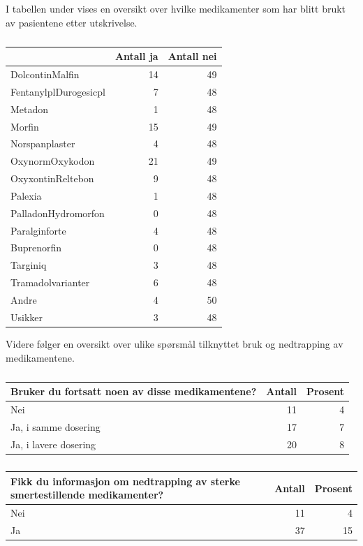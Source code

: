 \documentclass[
]{article}
\begin{document}
I tabellen under vises en oversikt over hvilke medikamenter som har
blitt brukt av pasientene etter utskrivelse.

\begin{table}

\caption{\label{tab:opi}}
\centering
\begin{tabular}[t]{l|r|r}
\hline
  & Antall ja & Antall nei\\
\hline
DolcontinMalfin & 14 & 49\\
\hline
FentanylplDurogesicpl & 7 & 48\\
\hline
Metadon & 1 & 48\\
\hline
Morfin & 15 & 49\\
\hline
Norspanplaster & 4 & 48\\
\hline
OxynormOxykodon & 21 & 49\\
\hline
OxyxontinReltebon & 9 & 48\\
\hline
Palexia & 1 & 48\\
\hline
PalladonHydromorfon & 0 & 48\\
\hline
Paralginforte & 4 & 48\\
\hline
Buprenorfin & 0 & 48\\
\hline
Targiniq & 3 & 48\\
\hline
Tramadolvarianter & 6 & 48\\
\hline
Andre & 4 & 50\\
\hline
Usikker & 3 & 48\\
\hline
\end{tabular}
\end{table}

Videre følger en oversikt over ulike spørsmål tilknyttet bruk og
nedtrapping av medikamentene.

\begin{table}

\caption{\label{tab:opi}}
\centering
\begin{tabular}[t]{l|r|r}
\hline
Bruker du fortsatt noen av disse medikamentene? & Antall  & Prosent\\
\hline
Nei & 11 & 4\\
\hline
Ja, i samme dosering & 17 & 7\\
\hline
Ja, i lavere dosering & 20 & 8\\
\hline
\end{tabular}
\end{table}

\begin{table}

\caption{\label{tab:opi}}
\centering
\begin{tabular}[t]{l|r|r}
\hline
Fikk du informasjon om nedtrapping av sterke smertestillende medikamenter? & Antall  & Prosent\\
\hline
Nei & 11 & 4\\
\hline
Ja & 37 & 15\\
\hline
\end{tabular}
\end{table}
\end{document}
